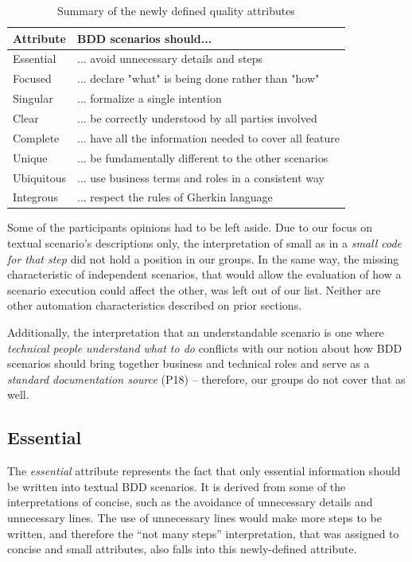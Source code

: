 \begin{table}[t]
	\renewcommand{\arraystretch}{1}
	\caption{Summary of the newly defined quality attributes}
	\label{tbl:summary_new_attributes}
	\centering
	\begin{tabular}{|m{2cm}|m{10cm}|}
		\hline
		\textbf{Attribute} & \textbf{BDD scenarios should...}\\
		\hline
		Essential & ... avoid unnecessary details and steps\\
		\hline
		Focused & ... declare "what" is being done rather than "how"\\
		\hline
		Singular & ... formalize a single intention\\
		\hline
		Clear & ... be correctly understood by all parties involved\\
		\hline
		Complete & ... have all the information needed to cover all feature\\
		\hline
		Unique & ... be fundamentally different to the other scenarios\\
		\hline
		Ubiquitous & ... use business terms and roles in a consistent way\\
		\hline
		Integrous & ... respect the rules of Gherkin language\\
		\hline
	\end{tabular}
\end{table}


Some of the participants opinions had to be left aside. Due to our focus on textual scenario's descriptions only, the interpretation of small as in a \textit{small code for that step} did not hold a position in our groups. In the same way, the missing characteristic of independent scenarios, that would allow the evaluation of how a scenario execution could affect the other, was left out of our list. Neither are other automation characteristics described on prior sections.

Additionally, the interpretation that an understandable scenario is one where \textit{technical people understand what to do} conflicts with our notion about how BDD scenarios should bring together business and technical roles and serve as a \textit{standard documentation source} (P18) -- therefore, our groups do not cover that as well.

\subsection{Essential}

The \textit{essential} attribute represents the fact that only essential information should be written into textual BDD scenarios. It is derived from some of the interpretations of concise, such as the avoidance of unnecessary details and unnecessary lines. The use of unnecessary lines would make more steps to be written, and therefore the ``not many steps'' interpretation, that was assigned to concise and small attributes, also falls into this newly-defined attribute. 

